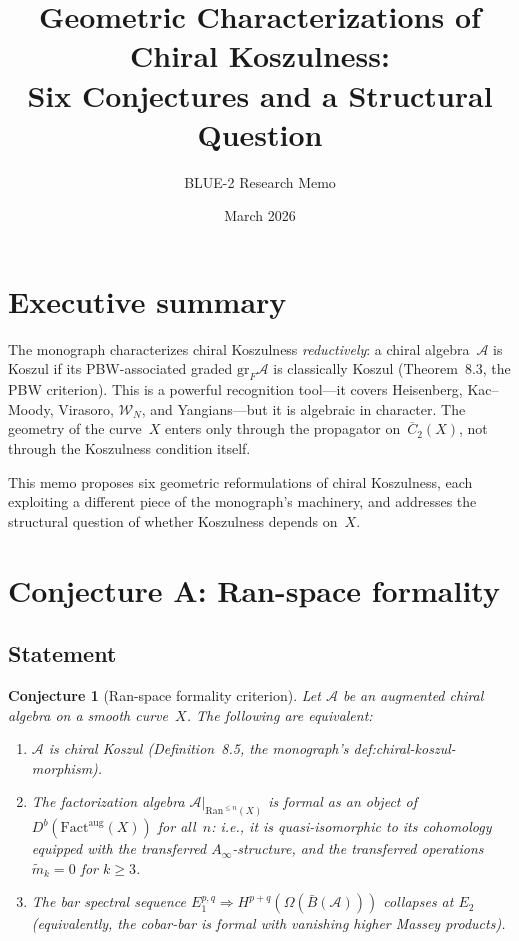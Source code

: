 \documentclass[11pt]{article}
\title{Geometric Characterizations of Chiral Koszulness:\\
  Six Conjectures and a Structural Question}
\author{BLUE-2 Research Memo}
\date{March 2026}
\newcommand{\cA}{\mathcal{A}}
\newcommand{\Ran}{\mathrm{Ran}}
\newcommand{\barB}{\bar{B}}
\newcommand{\gr}{\mathrm{gr}}
\newcommand{\Fact}{\mathrm{Fact}}
\newcommand{\Ainf}{A_\infty}
\theoremstyle{plain}
\newtheorem{conjecture}{Conjecture}[section]
\theoremstyle{definition}
\theoremstyle{remark}
\begin{document}
\maketitle

\tableofcontents

\section{Executive summary}

The monograph characterizes chiral Koszulness \emph{reductively}:
a chiral algebra~$\cA$ is Koszul if its PBW-associated graded
$\gr_F\cA$ is classically Koszul (Theorem~8.3, the PBW criterion).
This is a powerful recognition tool---it covers Heisenberg,
Kac--Moody, Virasoro, $\mathcal{W}_N$, and Yangians---but it
is algebraic in character.  The geometry of the curve~$X$ enters
only through the propagator on~$\overline{C}_2(X)$, not through
the Koszulness condition itself.

This memo proposes six geometric reformulations of chiral
Koszulness, each exploiting a different piece of the monograph's
machinery, and addresses the structural question of whether
Koszulness depends on~$X$.


\section{Conjecture A: Ran-space formality}
\label{sec:ran-formality}

\subsection{Statement}

\begin{conjecture}[Ran-space formality criterion]
\label{conj:ran-formality}
Let $\cA$ be an augmented chiral algebra on a smooth curve~$X$.
The following are equivalent:
\begin{enumerate}[label=(\roman*)]
\item $\cA$ is chiral Koszul (Definition~8.5, the monograph's
  def:chiral-koszul-morphism).
\item The factorization algebra $\cA|_{\Ran^{\leq n}(X)}$ is
  \emph{formal} as an object of
  $D^b(\Fact^{\mathrm{aug}}(X))$ for all~$n$: i.e., it is
  quasi-isomorphic to its cohomology equipped with the
  transferred $\Ainf$-structure, and the transferred operations
  $\tilde{m}_k = 0$ for $k \geq 3$.
\item The bar spectral sequence
  $E_1^{p,q} \Rightarrow H^{p+q}(\Omega(\barB(\cA)))$ collapses
  at $E_2$ (equivalently, the cobar-bar is formal with vanishing
  higher Massey products).
\end{enumerate}
\end{conjecture}
\end{document}
